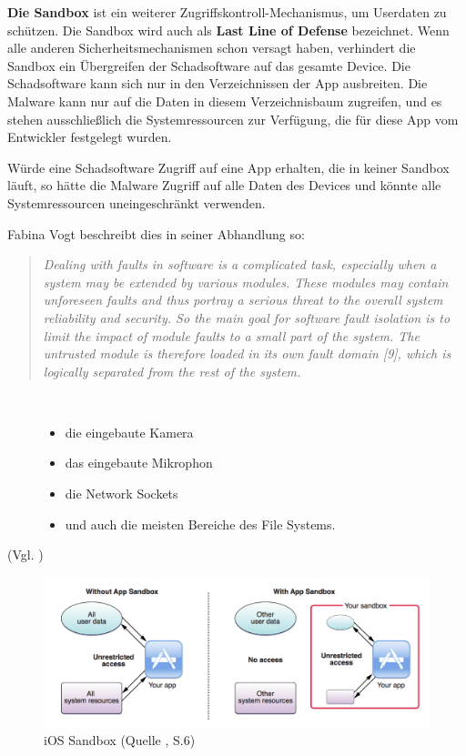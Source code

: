 \textbf{Die Sandbox} ist ein weiterer Zugriffskontroll-Mechanismus, um Userdaten zu schützen. Die Sandbox wird auch als \textbf{Last Line of Defense} bezeichnet. Wenn alle anderen Sicherheitsmechanismen schon versagt haben, verhindert die Sandbox ein Übergreifen der Schadsoftware auf das gesamte Device. Die Schadsoftware kann sich nur in den Verzeichnissen der App ausbreiten. Die Malware kann nur auf die Daten in diesem Verzeichnisbaum zugreifen, und es stehen ausschließlich die Systemressourcen zur Verfügung, die für diese App vom Entwickler festgelegt wurden. \par
Würde eine Schadsoftware Zugriff auf eine App erhalten, die in keiner Sandbox läuft, so hätte die Malware Zugriff auf alle Daten des Devices und könnte alle Systemressourcen uneingeschränkt verwenden.\par
Fabina Vogt beschreibt dies in seiner Abhandlung so: 
\begin{quote}
    \textit{\glqq Dealing with faults in software is a complicated task, especially when a system may be extended by various modules. These modules may contain unforeseen faults and thus portray a serious threat to the overall system reliability and security. So the main goal for software fault isolation is to limit the impact of module faults to a small part of the system. The untrusted module is therefore loaded in its own fault domain [9], which is logically separated from the rest of the system.\grqq{}} \cite{Sandbox[4]}
\end{quote}
\begin{description}
    \item[\parbox{\textwidth} {Unter anderem könnte die Malware folgende Systemressourcen unbemerkt vom User verwenden}]~\par
    \begin{itemize}
        \item die eingebaute Kamera
        \item das eingebaute Mikrophon
        \item die Network Sockets
        \item und auch die meisten Bereiche des File Systems.
    \end{itemize}
\end{description} 
(Vgl. \cite{Apple[6], Sandbox[1], Sandbox[2],Sandbox[3], Sandbox[4], Sandbox[5], Sandbox[6]})

\begin{figure}[hp!]
        \centering
                \includegraphics[scale=0.5]{iOSsandbox}
        \caption{iOS Sandbox (Quelle \cite{Sandbox[3]}, S.6)}
        \label{fig:iOSsandbox}
\end{figure}

